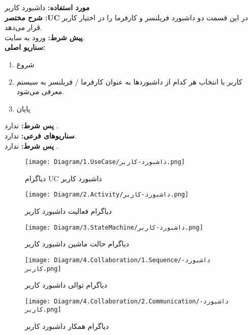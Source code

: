 \textbf{مورد استفاده:}
داشبورد کاربر
\\
\textbf{شرح مختصر :UC}
در این قسمت دو داشبورد فریلنسر و کارفرما را در اختیار کاربر قرار می‌دهد.
\\
\textbf{پيش شرط:}
ورود به سایت.
\\
\textbf{سناريو اصلی:}
\begin{enumerate}
\item
شروع
\item
کاربر با انتخاب هر کدام از داشبوردها به عنوان کارفرما / فریلنسر به سیستم معرفی می‌شود.
\item
پایان
\end{enumerate}

\noindent
\textbf{پس شرط:}
ندارد .
\\
\textbf{سناريوهای فرعی:}
ندارد.
\\
\textbf{پس شرط:}
ندارد .


\begin{figure}[H]
	\centering
	\texttt{[image: Diagram/1.UseCase/داشبورد-کاربر.png]}
	\caption{دیاگرام UC داشبورد کاربر‌}
	\label{fig:uc:داشبورد-کاربر}
\end{figure}
\begin{figure}[H]
	\texttt{[image: Diagram/2.Activity/داشبورد-کاربر.png]}
	\centering
	\caption{دیاگرام فعالیت ‌داشبورد کاربر}
	\label{fig:a:داشبورد-کاربر}
\end{figure}
\begin{figure}[H]
\texttt{[image: Diagram/3.StateMachine/داشبورد-کاربر.png]}
\centering
\caption{دیاگرام حالت ماشین ‌داشبورد کاربر}
\label{fig:sm:داشبورد-کاربر}
\end{figure}
\begin{figure}[H]
	\texttt{[image: Diagram/4.Collaboration/1.Sequence/داشبورد-کاربر.png]}
	\caption{دیاگرام توالی ‌داشبورد کاربر}
	\centering
	\label{fig:s:داشبورد-کاربر}
\end{figure}
\begin{figure}[H]
\texttt{[image: Diagram/4.Collaboration/2.Communication/داشبورد-کاربر.png]}
\centering
\caption{دیاگرام همکار داشبورد کاربر}
\label{fig:c:داشبورد-کاربر}
\end{figure}
